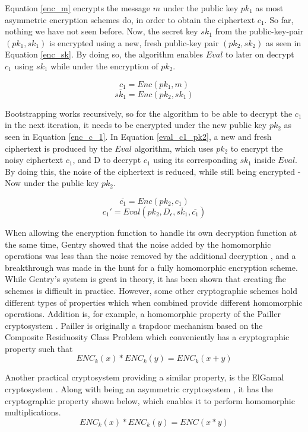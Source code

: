 Equation \ref{enc_m} encrypts the message $m$ under the public key $pk_1$ as most asymmetric encryption schemes do, in order to obtain the ciphertext $c_1$. So far, nothing we have not seen before. Now, the secret key $sk_1$ from the public-key-pair $(pk_1,sk_1)$ is encrypted using a new, fresh public-key pair $(pk_2, sk_2)$ as seen in Equation \ref{enc_sk}. By doing so, the algorithm enables $Eval$ to later on decrypt $c_1$ using $sk_1$ while under the encryption of $pk_2$.

\begin{equation}
\label{enc_m}
c_1 = Enc(pk_1, m)
\end{equation}
\begin{equation}
\label{enc_sk}
\overline{sk_1} = Enc(pk_2, sk_1)
\end{equation}

Bootstrapping works recursively, so for the algorithm to be able to decrypt the $c_1$ in the next iteration, it needs to be encrypted under the new public key $pk_2$ as seen in Equation \ref{enc_c_1}. In Equation \ref{eval_c1_pk2}, a new and fresh ciphertext is produced by the $Eval$ algorithm, which uses $pk_2$ to encrypt the noisy ciphertext $c_1$, and D to decrypt $c_1$ using its corresponding $sk_1$ inside $Eval$. By doing this, the noise of the ciphertext is reduced, while still being encrypted - Now under the public key $pk_2$. 

\begin{equation}
\label{enc_c_1}
\overline{c_1} = Enc(pk_2, c_1)
\end{equation}
\begin{equation}
\label{eval_c1_pk2}
c_1' = Eval(pk_2, D_{\epsilon}, \overline{sk_1}, \overline{c_1})
\end{equation}

When allowing the encryption function to handle its own decryption function at the same time, Gentry showed that the noise added by the homomorphic operations was less than the noise removed by the additional decryption \cite{Gentry_computing_arb_func_enc_data}, and a breakthrough was made in the hunt for a fully homomorphic encryption scheme. While Gentry's system is great in theory, it has been shown that creating \gls{fhe} schemes is difficult in practice. However, some other cryptographic schemes hold different types of properties which when combined provide different homomorphic operations. Addition is, for example, a homomorphic property of the Pailler cryptosystem \citep{Paillier}. Pailler is originally a trapdoor mechanism based on the Composite Residuosity Class Problem which conveniently has a cryptographic property such that \[ENC_k(x) * ENC_k(y) = ENC_k(x + y)\]

Another practical cryptosystem providing a similar property, is the ElGamal cryptosystem \cite{elgamal}. Along with being an asymmetric cryptosystem , it has the cryptographic property shown below, which enables it to perform homomorphic multiplications.  \[ENC_k(x) * ENC_k(y) = ENC(x * y)\]


